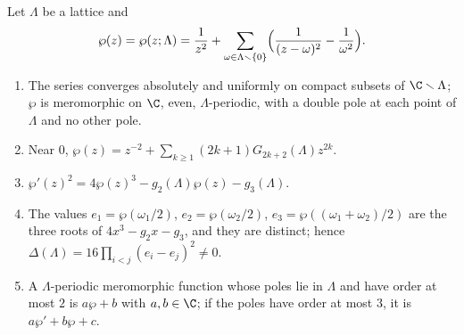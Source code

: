 \begin{theorem}\label{thm:ellcurves:wp}
Let $\Lambda$ be a lattice and
\[
\wp(z)=\wp(z;\Lambda)=\frac1{z^2}+\sum_{\omega\in\Lambda\smallsetminus\{0\}}\Bigl(\frac1{(z-\omega)^2}-\frac1{\omega^2}\Bigr).
\]
\begin{enumerate}[label=(\roman*)]
\item The series converges absolutely and uniformly on compact subsets of $\C\smallsetminus\Lambda$; $\wp$ is meromorphic on $\C$, even, $\Lambda$-periodic, with a double pole at each
point of $\Lambda$ and no other pole.
\item Near $0$, $\wp(z)=z^{-2}+\sum_{k\ge1}(2k+1)G_{2k+2}(\Lambda)z^{2k}$.
\item $\wp'(z)^2=4\wp(z)^3-g_2(\Lambda)\wp(z)-g_3(\Lambda)$.
\item The values $e_1=\wp(\omega_1/2)$, $e_2=\wp(\omega_2/2)$, $e_3=\wp((\omega_1+\omega_2)/2)$ are the three roots of $4x^3-g_2x-g_3$, and they are distinct; hence
$\Delta(\Lambda)=16\prod_{i<j}(e_i-e_j)^2\ne0$.
\item A $\Lambda$-periodic meromorphic function whose poles lie in $\Lambda$ and have order at most $2$ is $a\wp+b$ with $a,b\in\C$; if the poles have order at most $3$, it is
$a\wp'+b\wp+c$.
\end{enumerate}
\end{theorem}

